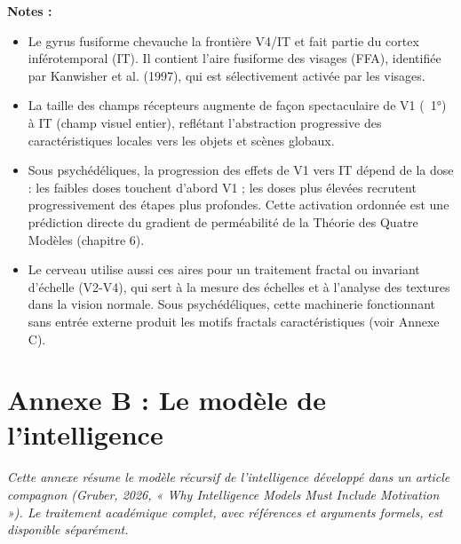 \documentclass[11pt, twoside, openright]{book}
\begin{document}
\textbf{Notes :}
\begin{itemize}
  \item Le gyrus fusiforme chevauche la frontière V4/\allowbreak{}IT et fait partie du cortex inférotemporal (IT). Il contient l'aire fusiforme des visages (FFA), identifiée par Kanwisher et al. (1997), qui est sélectivement activée par les visages.
  \item La taille des champs récepteurs augmente de façon spectaculaire de V1 (~1°) à IT (champ visuel entier), reflétant l'abstraction progressive des caractéristiques locales vers les objets et scènes globaux.
  \item Sous psychédéliques, la progression des effets de V1 vers IT dépend de la dose : les faibles doses touchent d'abord V1 ; les doses plus élevées recrutent progressivement des étapes plus profondes. Cette activation ordonnée est une prédiction directe du gradient de perméabilité de la Théorie des Quatre Modèles (chapitre 6).
  \item Le cerveau utilise aussi ces aires pour un traitement fractal ou invariant d'échelle (V2-V4), qui sert à la mesure des échelles et à l'analyse des textures dans la vision normale. Sous psychédéliques, cette machinerie fonctionnant sans entrée externe produit les motifs fractals caractéristiques (voir Annexe C).
\end{itemize}


\chapter*{Annexe B : Le modèle de l'intelligence}

\textit{Cette annexe résume le modèle récursif de l'intelligence développé dans un article compagnon (Gruber, 2026, « Why Intelligence Models Must Include Motivation »). Le traitement académique complet, avec références et arguments formels, est disponible séparément.}
\end{document}
